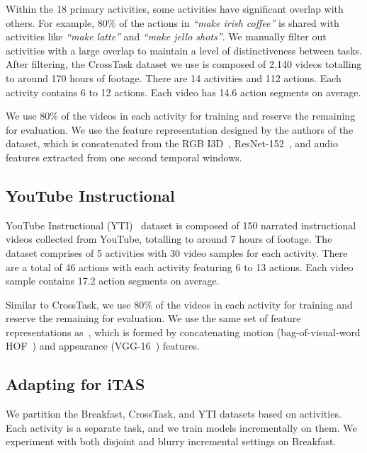 Within the 18 primary activities, some activities have significant overlap with others. For example, $80\%$ of the actions in \emph{``make irish coffee''} is shared with activities like \emph{``make latte''} and \emph{``make jello shots''}. We manually filter out activities with a large overlap to maintain a level of distinctiveness between tasks. After filtering, the CrossTask dataset we use is composed of 2,140 videos totalling to around 170 hours of footage. There are 14 activities and 112 actions. Each activity contains 6 to 12 actions. Each video has 14.6 action segments on average.

We use 80\% of the videos in each activity for training and reserve the remaining for evaluation. We use the feature representation designed by the authors of the dataset, which is concatenated from the RGB I3D~\cite{carreira2017quo}, ResNet-152~\cite{he2016resnet}, and audio~\cite{hershey2017cnnaudio} features extracted from one second temporal windows.

\subsection{YouTube Instructional}

YouTube Instructional (YTI)~\cite{alayrac2016unsupervised}  dataset is composed of 150 narrated instructional videos collected from YouTube, totalling to around 7 hours of footage. The dataset comprises of 5 activities with 30 video samples for each activity. There are a total of 46 actions with each activity featuring 6 to 13 actions. Each video sample contains 17.2 action segments on average.

Similar to CrossTask, we use 80\% of the videos in each activity for training and reserve the remaining for evaluation. We use the same set of feature representations as~\cite{sener2018unsupervised,kukleva2019unsupervised}, which is formed by concatenating motion (bag-of-visual-word HOF~\cite{wang2013action}) and appearance (VGG-16~\cite{simonyan2015very}) features.

\subsection{Adapting for iTAS}

We partition the Breakfast, CrossTask, and YTI  datasets based on activities. Each activity is a separate task, and we train models incrementally on them. We experiment with both disjoint and blurry incremental settings on Breakfast. 

